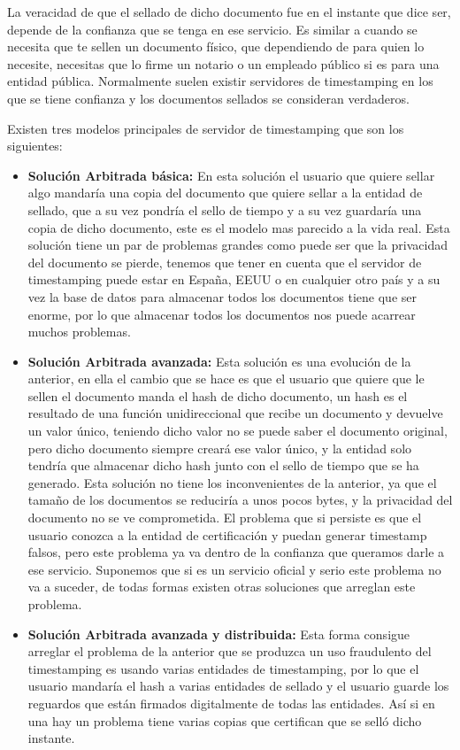 La veracidad de que el sellado de dicho documento fue en el instante que dice ser, depende de la confianza que se tenga en ese servicio. Es similar a cuando se necesita que te sellen un documento físico, que dependiendo de para quien lo necesite, necesitas que lo firme un notario o un empleado público si es para una entidad pública. Normalmente suelen existir servidores de timestamping en los que se tiene confianza y los documentos sellados se consideran verdaderos.

Existen tres modelos principales de servidor de timestamping que son los siguientes:
\begin{itemize}
\item \textbf{Solución Arbitrada básica:} En esta solución el usuario que quiere sellar algo mandaría una copia del documento que quiere sellar a la entidad de sellado, que a su vez pondría el sello de tiempo y a su vez guardaría una copia de dicho documento, este es el modelo mas parecido a la vida real. Esta solución tiene un par de problemas grandes como puede ser que la privacidad del documento se pierde, tenemos que tener en cuenta que el servidor de timestamping puede estar en España, EEUU o en cualquier otro país y a su vez la base de datos para almacenar todos los documentos tiene que ser enorme, por lo que almacenar todos los documentos nos puede acarrear muchos problemas.

\item \textbf{Solución Arbitrada avanzada:} Esta solución es una evolución de la anterior, en ella el cambio que se hace es que el usuario que quiere que le sellen el documento manda el hash de dicho documento, un hash es el resultado de una función unidireccional que recibe un documento y devuelve un valor único, teniendo dicho valor no se puede saber el documento original, pero dicho documento siempre creará ese valor único, y la entidad solo tendría que almacenar dicho hash junto con el sello de tiempo que se ha generado. Esta solución no tiene los inconvenientes de la anterior, ya que el tamaño de los documentos se reduciría a unos pocos bytes, y la privacidad del documento no se ve comprometida. El problema que si persiste es que el usuario conozca a la entidad de certificación y puedan generar timestamp falsos, pero este problema ya va dentro de la confianza que queramos darle a ese servicio. Suponemos que si es un servicio oficial y serio este problema no va a suceder, de todas formas existen otras soluciones que arreglan este problema.

\item \textbf{Solución Arbitrada avanzada y distribuida:} Esta forma consigue arreglar el problema de la anterior que se produzca un uso fraudulento del timestamping es usando varias entidades de timestamping, por lo que el usuario mandaría el hash a varias entidades de sellado y el usuario guarde los reguardos que están firmados digitalmente de todas las entidades. Así si en una hay un problema tiene varias copias que certifican que se selló dicho instante.


\end{itemize}
